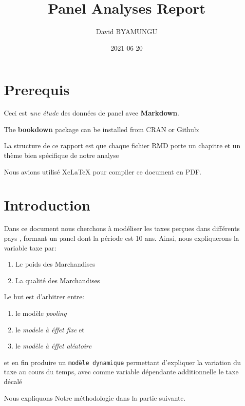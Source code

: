 \documentclass[
]{book}
\title{Panel Analyses Report}
\author{David BYAMUNGU}
\date{2021-06-20}
\providecommand{\tightlist}{%
  \setlength{\itemsep}{0pt}\setlength{\parskip}{0pt}}
\begin{document}
\maketitle

{
\setcounter{tocdepth}{1}
\tableofcontents
}
\hypertarget{prerequis}{%
\chapter{Prerequis}\label{prerequis}}

Ceci est \emph{une étude} des données de panel avec \textbf{Markdown}.

The \textbf{bookdown} package can be installed from CRAN or Github:

La structure de ce rapport est que chaque fichier RMD porte un chapitre et un thème bien spécifique de notre analyse

Nous avions utilisé XeLaTeX pour compiler ce document en PDF.

\hypertarget{intro}{%
\chapter{Introduction}\label{intro}}

Dans ce document nous cherchons à modéliser les taxes perçues dans différents pays , formant un panel dont la période est 10 ans.
Ainsi, nous expliquerons la variable taxe par:

\begin{enumerate}
\def\labelenumi{(\arabic{enumi})}
\tightlist
\item
  Le poids des Marchandises
\item
  La qualité des Marchandises
\end{enumerate}

Le but est d'arbitrer entre:

\begin{enumerate}
\def\labelenumi{(\arabic{enumi})}
\tightlist
\item
  le modèle \emph{pooling}
\item
  le \emph{modele à éffet fixe} et
\item
  le \emph{modèle à éffet aléatoire}
\end{enumerate}

et en fin produire un \texttt{modèle\ dynamique} permettant d'expliquer la variation du taxe au cours du temps, avec comme variable dépendante additionnelle le taxe décalé

Nous expliquons Notre méthodologie dans la partie suivante.
\end{document}
